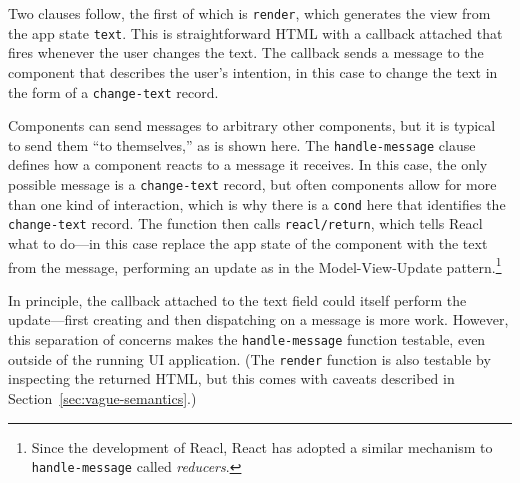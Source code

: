 \documentclass[sigplan,screen]{acmart}
\begin{document}
Two clauses follow, the first of which is \texttt{render}, which
generates the view from the app state \texttt{text}.  This is
straightforward HTML with a callback attached that fires whenever the
user changes the text.  The callback sends a
message to the component that describes the user's intention,
in this case to change the text in the form of a \texttt{change-text}
record.

Components can send messages to arbitrary other components, but it is
typical to send them ``to themselves,'' as is shown here.  The
\texttt{handle-message} clause defines how a component reacts to a
message it receives.  In this case, the only possible message is a
\texttt{change-text} record, but often components allow for more than
one kind of interaction, which is why there is a \texttt{cond} here that
identifies the \texttt{change-text} record.  The function then calls
\texttt{reacl/return}, which tells Reacl what
to do---in this case replace the app state of the component with the
text from the message, performing an update as in the
Model-View-Update pattern.\footnote{Since the development of Reacl,
  React has adopted a similar mechanism to \texttt{handle-message}
  called \textit{reducers}.}

In principle, the callback attached to the text field could itself
perform the update---first creating and then dispatching on a message
is more work.  However, this separation of concerns makes the
\texttt{handle-message} function testable, even outside of the running
UI application.  (The \texttt{render} function is also testable by
inspecting the returned HTML, but this comes with caveats described in
Section~\ref{sec:vague-semantics}.)
\end{document}
